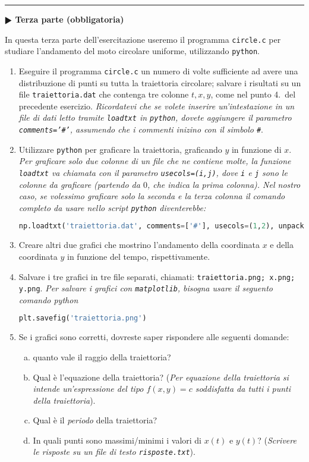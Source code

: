 \documentclass[11pt]{article}
\begin{document}
\hrule
\vspace{1mm}
\textbf{$\RHD$ Terza parte (obbligatoria)} 

In questa terza parte dell'esercitazione useremo il programma \texttt{circle.c} per
studiare l'andamento del moto circolare uniforme, utilizzando \texttt{python}.
\begin{enumerate}
\item Eseguire il programma \texttt{circle.c} un numero di volte sufficiente ad avere una distribuzione di punti su tutta la traiettoria circolare; salvare
  i risultati su un file \texttt{traiettoria.dat} che contenga tre colonne $t,x,y$, come nel punto 4.\ del precedente esercizio.
  {\em Ricordatevi che se volete inserire un'intestazione in un file di dati letto tramite \texttt{loadtxt} in \texttt{python}, dovete aggiungere il parametro \texttt{comments='\#'}, assumendo che i commenti inizino con il simbolo \texttt{\#}}.

\item Utilizzare \texttt{python} per graficare la traiettoria, graficando $y$ in funzione di $x$.
  {\em Per graficare solo due colonne di un file che ne contiene molte, la funzione \texttt{loadtxt} va chiamata 
  con il parametro \texttt{usecols=(i,j)}, dove \lstinline!i! e \lstinline!j! sono le colonne da graficare (partendo da $0$, che indica la prima colonna). Nel nostro caso, se volessimo graficare solo la seconda e la terza colonna il comando completo da usare nello script \texttt{python} diventerebbe:\/} \\
  \begin{lstlisting}[language=Python,numbers=none]
  np.loadtxt('traiettoria.dat', comments=['#'], usecols=(1,2), unpack=True)
\end{lstlisting}
\item 
  Creare altri due grafici che mostrino l'andamento della coordinata $x$ e della coordinata $y$ in funzione del tempo, rispettivamente.
\item Salvare i tre grafici in tre file separati, chiamati: \texttt{traiettoria.png; x.png; y.png}.
  {\em Per salvare i grafici con \texttt{matplotlib}, bisogna usare il seguento comando python\/}
\begin{lstlisting}[language=Python,numbers=none]
     plt.savefig('traiettoria.png')
\end{lstlisting}

\item Se i grafici sono corretti, dovreste saper rispondere alle seguenti domande:
\begin{enumerate}[(a)]
\item quanto vale il raggio della traiettoria? 
\item Qual \`e l'equazione della traiettoria? ({\em Per equazione della
  traiettoria si intende un'espressione del tipo $f(x,y)=c$ soddisfatta da tutti i punti della traiettoria\/}). 
\item Qual \`e il {\em periodo\/} della traiettoria? 
\item In quali punti sono massimi/minimi i valori di $x(t)$ e $y(t)$? ({\em Scrivere le risposte su un file di testo \texttt{risposte.txt}\/}).
\end{enumerate}
\end{enumerate}
\end{document}
